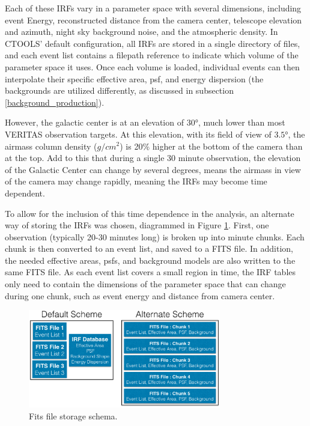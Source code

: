   Each of these IRFs vary in a parameter space with several dimensions, including event Energy, reconstructed distance from the camera center, telescope elevation and azimuth, night sky background noise, and the atmospheric density.
  In CTOOLS' default configuration, all IRFs are stored in a single directory of files, and each event list contains a filepath reference to indicate which volume of the parameter space it uses.
  Once each volume is loaded, individual events can then interpolate their specific effective area, psf, and energy dispersion (the backgrounds are utilized differently, as discussed in subsection \ref{background_production}).

  However, the galactic center is at an elevation of $\ang{30}$, much lower than most VERITAS observation targets.
  At this elevation, with its field of view of $\ang{3.5}$, the airmass column density ($g/cm^{2}$) is 20\% higher at the bottom of the camera than at the top.
  Add to this that during a single 30 minute observation, the elevation of the Galactic Center can change by several degrees, means the airmass in view of the camera may change rapidly, meaning the IRFs may become time dependent.

  To allow for the inclusion of this time dependence in the analysis, an alternate way of storing the IRFs was chosen, diagrammed in Figure \ref{fig:fits_scheme}.
  First, one observation (typically 20-30 minutes long) is broken up into  minute chunks.
  Each chunk is then converted to an event list, and saved to a FITS file.
  In addition, the needed effective areas, psfs, and background models are also written to the same FITS file.
  As each event list covers a small region in time, the IRF tables only need to contain the dimensions of the parameter space that can change during one chunk, such as event energy and distance from camera center.

  \begin{figure}[ht]
    \centering
    \includegraphics[width=0.75\textwidth]{images/FITS_diagrams_alternate_scheme.eps}
    \caption[FITS File Event Storage Schemes]
    {Fits file storage schema.}
    \label{fig:fits_scheme}
  \end{figure}

